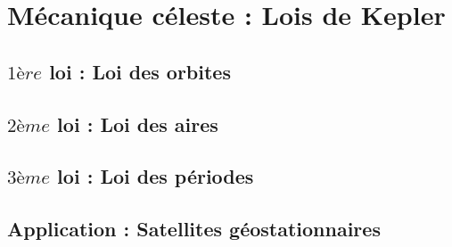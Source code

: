 \documentclass[11pt,a4paper]{article}
\begin{document}
\section{Mécanique céleste : Lois de Kepler }

\subsection{$1ère$ loi : Loi des orbites}


\subsection{$2ème$ loi : Loi des aires}



\subsection{$3ème$ loi : Loi des périodes}

\subsection{Application : Satellites géostationnaires }
\end{document}
